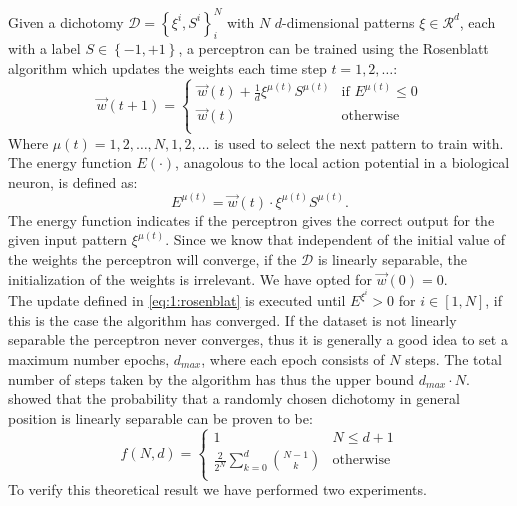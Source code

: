 Given a dichotomy $\mathcal{D} = \left\{\xi^i, S^i \right\}_{i}^{N}$ with $N$ $d$-dimensional patterns $\xi \in \mathcal{R}^d$, each with a label $S \in \left\{-1, +1 \right\}$, a perceptron can be trained using the Rosenblatt algorithm  which updates the weights each time step $t = 1, 2, \ldots$:
	\begin{equation}\label{eq:1:rosenblat}
		\vec{w}(t+1) = 
		\begin{cases}
		\vec{w}(t) + \frac{1}{d} \xi^{\mu(t)} S^{\mu(t)}
		& \text{if } E^{\mu(t)} \leq 0\\
		\vec{w}(t) 											
		& \text{otherwise}\\
		\end{cases}
	\end{equation}
Where $\mu(t) = 1, 2, \ldots, N, 1, 2, \ldots$ is used to select the next pattern to train with. The energy function $E(\cdot)$, anagolous to the local action potential in a biological neuron, is defined as:
	\begin{equation}\label{eq:1:energyFunction}
		E^{\mu(t)} = \vec{w}(t) \cdot \xi^{\mu(t)}S^{\mu(t)}.
	\end{equation}
The energy function indicates if the perceptron gives the correct output for the given input pattern $\xi^{\mu(t)}$. Since we know that independent of the initial value of the weights the perceptron will converge, if the $\mathcal{D}$ is linearly separable, the initialization of the weights is irrelevant. We have opted for $\vec{w}(0) = 0$.\\

The update defined in \autoref{eq:1:rosenblat} is executed until $E^{\xi^i} > 0$ for $i \in [1, N]$, if this is the case the algorithm has converged. If the dataset is not linearly separable the perceptron never converges, thus it is generally a good idea to set a maximum number epochs, $d_{max}$, where each epoch consists of $N$ steps. The total number of steps taken by the algorithm has thus the upper bound $d_{max} \cdot N$. \\


\textcite{cover1965geometrical} showed that the probability that a randomly chosen dichotomy  in general position is linearly separable can be proven to be:
	\begin{equation}\label{eq:1:lsChance}
		f(N,d) = 
		\begin{cases}
		1
		& N \leq d + 1\\
		\frac{2}{2^N} \displaystyle\sum_{k = 0}^{d} \binom{N - 1}{k}										
		& \text{otherwise}\\
		\end{cases}
	\end{equation}
To verify this theoretical result we have performed two experiments.


